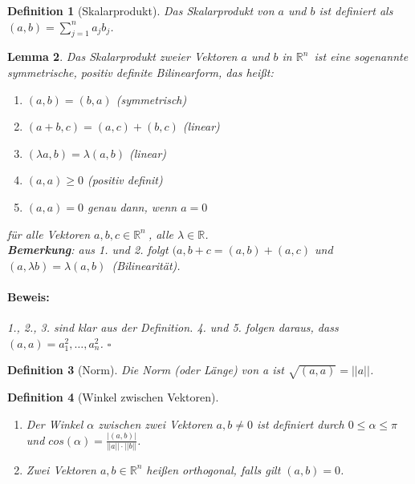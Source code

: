 \documentclass{report}
\newcommand{\IN}[1]{\index{#1|BH}}
\newcommand{\lb}{\lambda}
\newcommand{\R}{\mathbb{R}}
\newcommand{\Rn}{\mathbb{R}^n\ }
\newcommand{\mRn}{$\mathbb{R}^n$\ }
\newcommand{\al}{\alpha}
\theoremstyle{customrem}
\theoremstyle{customdef}
\newtheorem{definition}{Definition}[chapter]
\newtheorem{lemma}[definition]{Lemma}
\renewenvironment{proof}{\vspace{-.75cm}\paragraph{Beweis: }}{\vspace{-.5cm}\hfill$\square$}
\begin{document}
	\begin{definition}[Skalarprodukt]
		\IN{Skalar!-produkt}
		Das Skalarprodukt von $a$ und $b$ ist definiert als $(a, b) = \sum_{j=1}^n a_j b_j$.
	\end{definition}
	
	\begin{lemma}
		Das Skalarprodukt zweier Vektoren $a$ und $b$ in \mRn ist eine sogenannte symmetrische, positiv definite Bilinearform, das heißt:
		\begin{enumerate}
			\item $(a, b) = (b, a)$ (symmetrisch) 
			\item $(a + b, c) = (a, c) + (b, c)$ (linear) 
			\item $(\lb a, b) = \lb(a, b)$ (linear) 
			\item $(a, a) \ge 0$ (positiv definit) 
			\item $(a, a) = 0$ genau dann, wenn $a=0$ 
		\end{enumerate}
		für alle Vektoren $a, b, c \in \Rn$, alle $\lb \in \R$.\\
		\textbf{Bemerkung}: aus 1. und 2. folgt $(a, b+c = (a,b) + (a,c)$ und $(a, \lb b) = \lb (a, b)$\ (Bilinearität).\\
		\begin{proof}
			1., 2., 3. sind klar aus der Definition. 4. und 5. folgen daraus, dass $(a, a) = a_1^2, \ldots, a_n^2$.
		\end{proof}
	\end{lemma}
	\vspace{.2cm}
	\begin{definition}[Norm]
		Die Norm (oder Länge) von a ist $\sqrt{(a, a)} = ||a||$.
	\end{definition}

	\begin{definition}[Winkel zwischen Vektoren]$ $\vspace{-.5cm}
		\begin{enumerate}
			\item Der Winkel $\al$ zwischen zwei Vektoren $a, b \neq 0$ ist definiert durch $0 \le \al \le \pi$ und $cos(\al) = \frac{|(a,b)|}{||a||\cdot ||b||}$.
			\item Zwei Vektoren $a, b \in \R^n$ heißen orthogonal, falls gilt $(a, b) = 0$.
		\end{enumerate}
	\end{definition}
	
\end{document}
